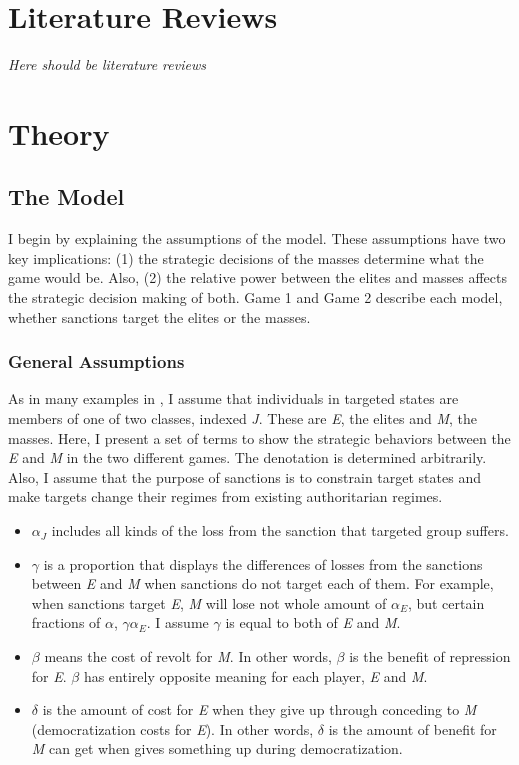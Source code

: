\documentclass[11pt, letterpage, titlepage]{article}
\begin{document}
\section*{Literature Reviews}	
\textit{Here should be literature reviews}

\section*{Theory}
\subsection*{The Model}
I begin by explaining the assumptions of the model. These assumptions have two key implications: (1) the strategic decisions of the masses determine what the game would be. Also, (2) the relative power between the elites and masses affects the strategic decision making of both. Game 1 and Game 2 describe each model, whether sanctions target the elites or the masses.
	
\subsubsection*{General Assumptions}
As in many examples in \cite{Acemoglu2006a}, I assume that individuals in targeted states are members of one of two classes, indexed \textit{J}. These are \textit{E}, the elites and \textit{M}, the masses. Here, I present a set of terms to show the strategic behaviors between the \textit{E} and \textit{M} in the two different games. The denotation is determined arbitrarily. Also, I assume that the purpose of sanctions is to constrain target states and make targets change their regimes from existing authoritarian regimes.
	
\begin{itemize}
	\item $\alpha_J$ includes all kinds of the loss from the sanction that targeted group suffers.
	\item $\gamma$ is a proportion that displays the differences of losses from the sanctions between \textit{E} and \textit{M} when sanctions do not target each of them. For example, when sanctions target \textit{E}, \textit{M} will lose not whole amount of $\alpha_{E}$, but certain fractions of $\alpha$, $\gamma\alpha_{E}$. I assume $\gamma$ is equal to both of \textit{E} and \textit{M}.
	\item $\beta$ means the cost of revolt for \textit{M}. In other words, $\beta$ is the benefit of repression for \textit{E}. $\beta$ has entirely opposite meaning for each player, \textit{E} and \textit{M}.
	\item $\delta$ is the amount of cost for \textit{E} when they give up through conceding to \textit{M} (democratization costs for \textit{E}). In other words, $\delta$ is the amount of benefit for \textit{M} can get when  gives something up during democratization.
\end{itemize}
	
\end{document}
